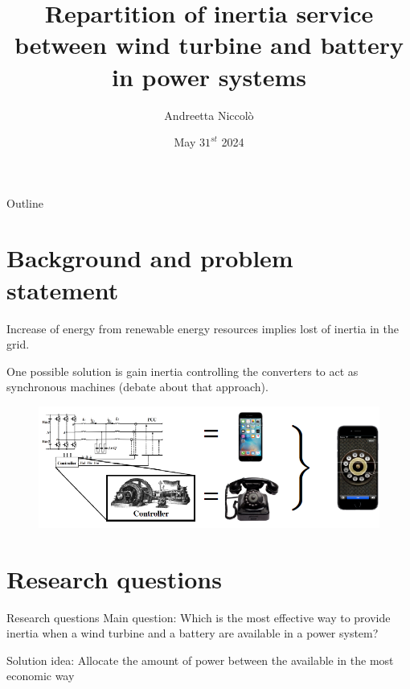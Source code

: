 \documentclass[aspectratio=169, 12pt]{beamer}
\title{ Repartition of inertia service between wind turbine and battery in power systems }
\author{Andreetta Niccolò}
\date{May $31^{st}$ 2024}
\begin{document}
  \maketitle

  \begin{frame}[fragile]{Outline}
    \tableofcontents
  \end{frame}

  \section{Background and problem statement}
  \begin{frame}{\insertsection}
    Increase of energy from renewable energy resources implies lost of inertia in the grid. 

    One possible solution is gain inertia controlling the converters to act as synchronous machines (debate about that approach).

    \begin{figure}
      \centering
      \includegraphics[width = 0.5\columnwidth]{florian_phone.png}
    \end{figure}
  \end{frame}
  
  \section{Research questions}
  \begin{frame}{Research questions}
    \textcolor{NTNUBlue}{Main question}: Which is the most effective way to provide inertia when a wind turbine and a battery are available in a power system?
    
    \textcolor{NTNUOrange}{Solution idea}: Allocate the amount of power between the available in the most economic way
  \end{frame}
  
\end{document}
